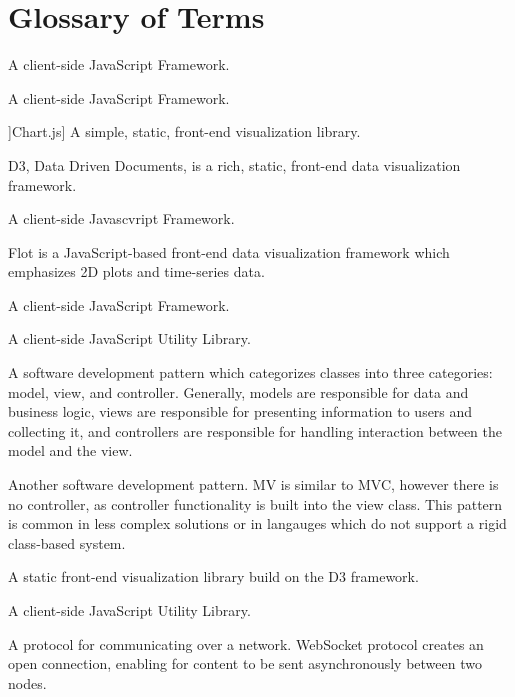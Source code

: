 \documentclass{report}
\begin{document}


\dotableofcontents

\newpage

\chapter*{Glossary of Terms}
\begin{description}
\item[Angular.js] A client-side JavaScript Framework.
\item[Backbone.js] A client-side JavaScript Framework.
\item]Chart.js] A simple, static, front-end visualization library.
\item[D3.js] D3, Data Driven Documents, is a rich, static, front-end data visualization framework.
\item[DOJO] A client-side Javascvript Framework.
\item[Flot] Flot is a JavaScript-based front-end data visualization framework which emphasizes 2D plots and time-series data.
\item[JavaScript MVC] A client-side JavaScript Framework.
\item[jQuery] A client-side JavaScript Utility Library.
\item[MVC] A software development pattern which categorizes classes into three categories: model, view, and controller. Generally, models are responsible for data and business logic, views are responsible for presenting information to users and collecting it, and controllers are responsible for handling interaction between the model and the view.
\item[MV] Another software development pattern. MV is similar to MVC, however there is no controller, as controller functionality is built into the view class. This pattern is common in less complex solutions or in langauges which do not support a rigid class-based system.
\item[Rickshaw] A static front-end visualization library build on the D3 framework.
\item[Underscore.js] A client-side JavaScript Utility Library.
\item[WebSocket] A protocol for communicating over a network. WebSocket protocol creates an open connection, enabling for content to be sent asynchronously between two nodes.
\end{description}
\end{document}
